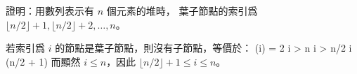 證明：用數列表示有 $n$ 個元素的堆時，
葉子節點的索引爲 $\lfloor n/2 \rfloor + 1,\lfloor n/2 \rfloor + 2, \ldots, n$。
\stopEXERCISE

\startANSWER
若索引爲 $i$ 的節點是葉子節點，則沒有子節點，等價於：
\startsplitformula\startmathalignment[n=1]
\NC {}(i) = 2 i > n \NR
\NC i > n/2 \NR
\NC i \ge (\lfloor n/2 \rfloor + 1) \NR
\stopmathalignment\stopsplitformula
而顯然 $i\le n$，因此 $\lfloor n/2 \rfloor + 1 \le i\le n$。
\stopANSWER
